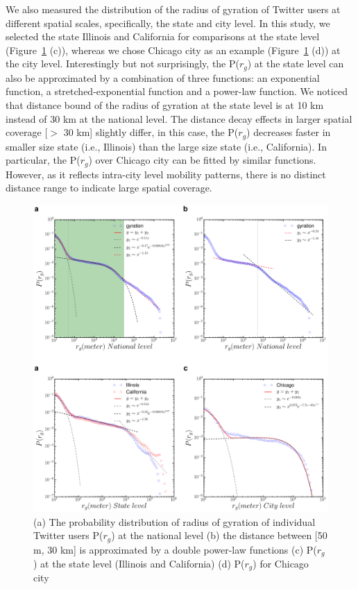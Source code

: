 \documentclass[ijgi,article,accept,moreauthors,pdftex,10pt,a4paper]{mdpi}
\theoremstyle{mdpi}
\newcounter{ex}
\newcounter{re}
\theoremstyle{mdpidefinition}
\begin{document}
We also measured the distribution of the radius of gyration of Twitter users at different spatial scales, specifically, the state and city level.
In this study, we selected the state Illinois and California for comparisons at the state level (Figure~\ref{fig:gyration} (c)), whereas we chose Chicago city as an example (Figure~\ref{fig:gyration} (d)) at the city level.
Interestingly but not surprisingly, the P($r_{g}$) at the state level can also be approximated by a combination of three functions: an exponential function, a stretched-exponential function and a power-law function.
We noticed that distance bound of the radius of gyration at the state level is at 10 km instead of 30 km at the national level.
The distance decay effects in larger spatial coverage [$>$ 30 km] slightly differ, in this case, the P($r_{g}$) decreases faster in smaller size state (i.e., Illinois) than the large size state (i.e., California).
In particular, the P($r_{g}$) over Chicago city can be fitted by similar functions.
However, as it reflects intra-city level mobility patterns, there is no distinct distance range to indicate large spatial coverage.

\begin{figure}[ht]
\centering
\includegraphics[width=1.0\linewidth]{./figures/gyration2}
\caption{ (a) The probability distribution of radius of gyration of individual Twitter users P($r_{g}$) at the national level (b) the distance between [50 m, 30 km] is approximated by a double power-law functions (c) P($r_{g}$) at the state level (Illinois and California) (d) P($r_{g}$) for Chicago city} 
\label{fig:gyration}
\end{figure}
\FloatBarrier
\end{document}
